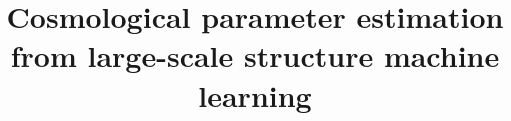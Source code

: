 \documentclass[twocolumn]{aastex61}
\begin{document}
\title{Cosmological parameter estimation from large-scale structure machine learning}


\end{document}
